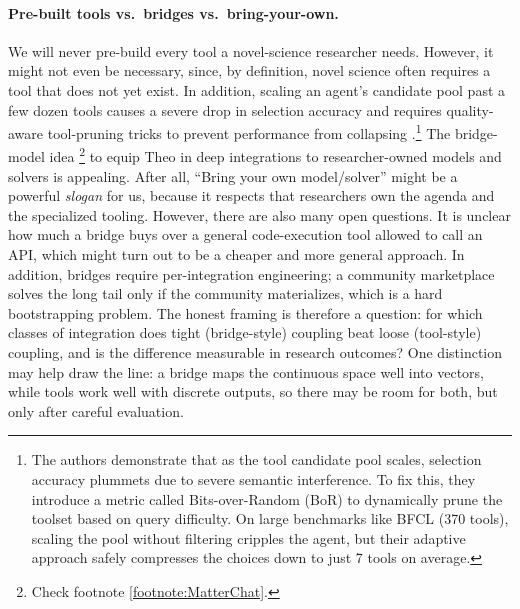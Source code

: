 \paragraph{Pre-built tools vs.\ bridges vs.\ bring-your-own.}
We will never pre-build every tool a novel-science researcher needs. However, it might not even be necessary, since, by definition, novel science often requires a tool that does not yet exist. In addition, scaling an agent's candidate pool past a few dozen tools causes a severe drop in selection accuracy and requires quality-aware tool-pruning tricks to prevent performance from collapsing \cite{2605.24660}.\footnote{
    The authors demonstrate that as the tool candidate pool scales, selection accuracy plummets due to severe semantic interference. To fix this, they introduce a metric called Bits-over-Random (BoR) to dynamically prune the toolset based on query difficulty. On large benchmarks like BFCL (370 tools), scaling the pool without filtering cripples the agent, but their adaptive approach safely compresses the choices down to just 7 tools on average.
    }
The bridge-model idea \cite{Tang2026}\footnote{Check footnote \ref{footnote:MatterChat}.} to equip Theo in deep integrations to researcher-owned models and solvers is appealing. 
After all, ``Bring your own model/solver'' might be a powerful \emph{slogan} for us, because it respects that researchers own the agenda and the specialized tooling.
However, there are also many open questions. It is unclear how much a bridge buys over a general code-execution tool allowed to call an API, which might turn out to be a cheaper and more general approach. In addition, bridges require per-integration engineering; a community marketplace solves the long tail only if the community materializes, which is a hard bootstrapping problem. The honest framing is therefore a question: for which classes of integration does tight (bridge-style) coupling beat loose (tool-style) coupling, and is the difference measurable in research outcomes? One distinction may help draw the line: a bridge maps the continuous space well into vectors, while tools work well with discrete outputs, so there may be room for both, but only after careful evaluation.